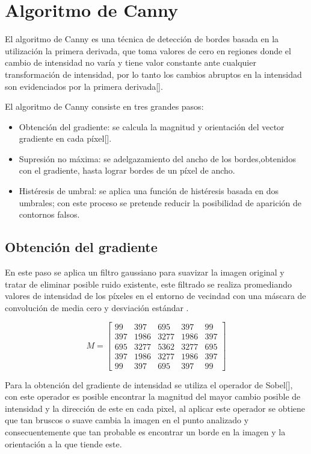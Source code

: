 \section{Algoritmo de Canny}

El algoritmo de Canny es una técnica de detección de bordes basada en la utilización la primera derivada, que toma valores de cero en regiones donde el cambio de intensidad no varía y tiene valor constante ante cualquier transformación de intensidad, por lo tanto los cambios abruptos en la intensidad son evidenciados por la primera derivada[].

El algoritmo de Canny consiste en tres grandes pasos: 

\begin{itemize}
\item Obtención del gradiente: se calcula la magnitud y orientación del vector gradiente en cada píxel[]. 
\item Supresión no máxima: se adelgazamiento del ancho de los bordes,obtenidos con el gradiente, hasta lograr bordes de un píxel de ancho. 
\item Histéresis de umbral: se aplica una función de histéresis basada en dos umbrales; con este proceso se pretende reducir la posibilidad de aparición de contornos falsos. 
\end{itemize}

\subsection{Obtención del gradiente}

En este paso se aplica un filtro gaussiano para suavizar la imagen original y tratar de eliminar posible ruido existente, este filtrado se realiza promediando valores de intensidad de los píxeles en el entorno de vecindad con una 
máscara de convolución de media cero y desviación estándar \sigma.

\begin{equation}
M =\begin{bmatrix}
99 & 397 & 695 & 397 & 99 \\ 
397 & 1986 & 3277 & 1986 & 397 \\ 
695 & 3277 & 5362 & 3277 & 695 \\ 
397 & 1986 & 3277 & 1986 & 397 \\ 
99 & 397 & 695 & 397 & 99
\end{bmatrix}
\end{equation}

Para la obtención del gradiente de intensidad se utiliza el operador de Sobel[], con este operador es posible encontrar la magnitud del mayor cambio posible de intensidad y la dirección de este en cada pixel, al aplicar este operador se obtiene que tan bruscos o suave cambia la imagen en el punto analizado y consecuentemente que tan probable es encontrar un borde en la imagen y la orientación a la que tiende este.

